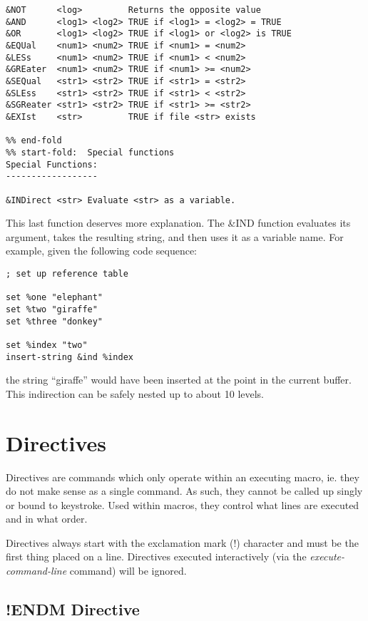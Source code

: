 \begin{verbatim}
&NOT      <log>         Returns the opposite value
&AND      <log1> <log2> TRUE if <log1> = <log2> = TRUE
&OR       <log1> <log2> TRUE if <log1> or <log2> is TRUE
&EQUal    <num1> <num2> TRUE if <num1> = <num2>
&LESs     <num1> <num2> TRUE if <num1> < <num2>
&GREater  <num1> <num2> TRUE if <num1> >= <num2>
&SEQual   <str1> <str2> TRUE if <str1> = <str2>
&SLEss    <str1> <str2> TRUE if <str1> < <str2>
&SGReater <str1> <str2> TRUE if <str1> >= <str2>
&EXIst    <str>         TRUE if file <str> exists

%% end-fold
%% start-fold:  Special functions
Special Functions:
------------------

&INDirect <str> Evaluate <str> as a variable.
\end{verbatim}

This last function deserves more explanation. The \&IND function
evaluates its argument, takes the resulting string, and then uses it as
a variable name. For example, given the following code sequence:

\begin{verbatim}
; set up reference table

set %one "elephant"
set %two "giraffe"
set %three "donkey"

set %index "two"
insert-string &ind %index
\end{verbatim}

the string ``giraffe'' would have been inserted at the point in the
current buffer. This indirection can be safely nested up to about 10
levels.

\section{Directives}

Directives are commands which only operate within an executing macro,
ie. they do not make sense as a single command. As such, they cannot be
called up singly or bound to keystroke. Used within macros, they
control what lines are executed and in what order.

Directives always start with the exclamation mark (!) character and
must be the first thing placed on a line. Directives executed
interactively (via the {\it execute-command-line} command) will be ignored.

\subsection{!ENDM Directive}

